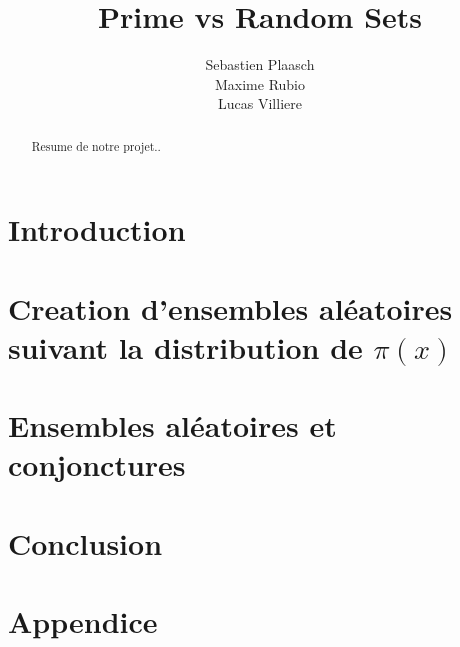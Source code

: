 \documentclass{article}
\begin{document}
\author{Sebastien Plaasch \\ Maxime Rubio  \\ Lucas Villiere}
\title{Prime vs Random Sets}
\maketitle
\newpage 
\begin{abstract}
    Resume de notre projet..
\end{abstract}
\newpage
\tableofcontents


\newpage

\section{Introduction}
    \label{sec:intro}


\section{Creation d'ensembles aléatoires suivant la distribution de $\pi(x)$}
    \label{sec:sec1}
    
    
    
		

\section{Ensembles aléatoires et conjonctures}
    
		
		
		
\section{Conclusion}

\clearpage
\appendix
	\section{Appendice}
		
		
\newpage
\printindex
\end{document}
